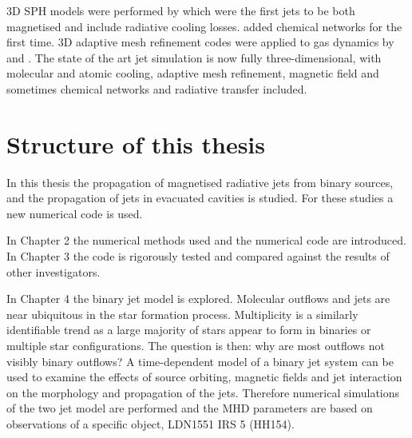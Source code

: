 3D SPH models were performed by \citet{1993ApJ...410..686D} which were the first jets to be both magnetised and include radiative cooling losses.
\citet{1999MNRAS.308.1126L} added chemical networks for the first time.
3D adaptive mesh refinement codes were applied to gas dynamics by \citet{1998ApJ...495..821T} and \citet{2001MNRAS.322..166L}.
The state of the art jet simulation is now fully three-dimensional, with
molecular and atomic cooling, adaptive mesh refinement, magnetic field and
sometimes chemical networks and radiative transfer included.



\section{Structure of this thesis}


In this thesis the propagation of magnetised radiative jets from binary sources, and the propagation of jets in evacuated cavities is studied. For these studies a new numerical code is used.

In Chapter 2 the numerical methods used and the numerical code are introduced. 
In Chapter 3 the code is rigorously tested and compared against the results of other investigators. 

In Chapter 4 the binary jet model is explored. 
Molecular outflows and jets are near ubiquitous in the star formation process.
%
Multiplicity is a similarly identifiable trend as a large majority of stars appear to form in binaries or multiple star configurations.
The question is then: why are most outflows not visibly binary outflows?
A time-dependent model of a binary jet system can be used to examine the effects of source orbiting, magnetic fields and jet interaction on the morphology and propagation of the jets.
Therefore numerical simulations of the two jet model are performed and the MHD parameters are based on observations of a specific object, LDN1551 IRS 5 (HH154).


